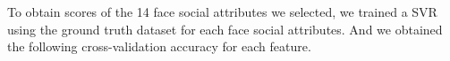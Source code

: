 \documentclass[12pt]{article}
\newenvironment{p3}[2][IV Scoring Face Social Attributes with SVR]{\begin{trivlist}
\item[\hskip \labelsep {\bfseries #1}\hskip \labelsep {\bfseries #2}]}{\end{trivlist}}
\begin{document}
\begin{p3}{}
To obtain scores of the 14 face social attributes we selected, we trained a SVR using the ground truth dataset for each face social attributes. And we obtained the following cross-validation accuracy for each feature.

\item{}
\end{p3}

 
\end{document}
